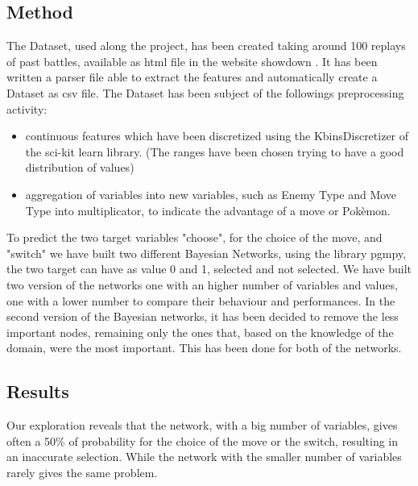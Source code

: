 \documentclass[letterpaper]{article}
\begin{document}
\subsection{Method}
The Dataset, used along the project, has been created taking around 100 replays of past battles, available as html file in the website showdown \cite{showdown}. It has been written a parser file able to extract the features and automatically create a Dataset as csv file.
The Dataset has been subject of the followings preprocessing activity:
\begin{itemize}
    \item continuous features which have been discretized using the KbinsDiscretizer of the sci-kit learn library. (The ranges have been chosen trying to have a good distribution of values)
    \item aggregation of variables into new variables, such as Enemy Type and Move Type into multiplicator, to indicate the advantage of a move or Pokèmon.
\end{itemize}
To predict the two target variables "choose", for the choice of the move, and "switch" we have built two different Bayesian Networks, using the library pgmpy, the two target can have as value 0 and 1, selected and not selected.
We have built two version of the networks one with an higher number of variables and values, one with a lower number to compare their behaviour and performances.
In the second version of the Bayesian networks, it has been decided to remove the less important nodes, remaining only the ones that, based on the knowledge of the domain, were the most important. This has been done for both of the networks.


\subsection{Results}
Our exploration reveals that the network, with a big number of variables, gives often a 50\% of probability for the choice of the move or the switch, resulting in an inaccurate selection. While the network with the smaller number of variables rarely gives the same problem.
\end{document}
